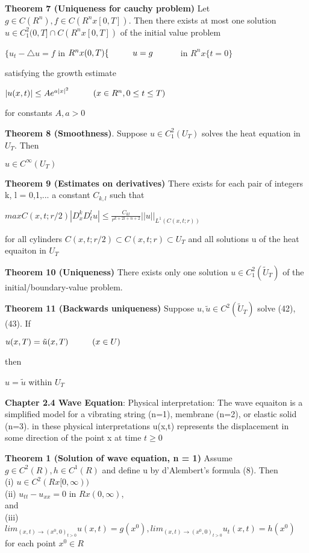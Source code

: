 \documentclass{article}
\newcommand\tab[1][1cm]{\hspace*{#1}}
\begin{document}
\textbf {Theorem 7 (Uniqueness for cauchy problem)} Let $g \in C(R^n), f \in C(R^n x [0,T])$. Then there exists at most one solution $u \in C_1^2(0, T] \cap C(R^n x [0,T])$ of the initial value problem
\begin{center}
$\{ u_t - \triangle u = f$ \tab in $R^n x (0,T) 
 \{ \tab u = g \tab$ in $R^n x \{t = 0\}$
\end{center}
satisfying the growth estimate
\begin{center}
$|u(x,t)| \leq Ae^{a|x|^2} \tab (x \in R^n, 0 \leq t \leq T)$
\end{center}
for constants $A, a > 0$

\textbf {Theorem 8 (Smoothness)}. Suppose $u \in C_1^2(U_T)$ solves the heat equation in $U_T$. Then
\begin{center}
$u \in C^{\infty}(U_T)$
\end{center}

\textbf {Theorem 9 (Estimates on derivatives)} There exists for each pair of integers k, l = 0,1,... a constant $C_{k,l}$ such that 
\begin{center}
$max{C(x,t; r/2)} |D_x^k D_t^l u| \leq \frac{C_{kl}}{r^{k+2l+n+2}}||u||_{L^1(C(x,t;r))}$
\end{center}
for all cylinders $C(x, t;r/2) \subset C(x,t;r) \subset U_T$ and all solutions u of the heat equaiton in $U_T$

\textbf {Theorem 10 (Uniqueness)} There exists only one solution $u \in C_1^2(\tilde{U}_T)$ of the initial/boundary-value problem.

\textbf {Theorem 11 (Backwards uniqueness)} Suppose $u, \tilde{u} \in C^2(\tilde{U}_T)$ solve (42), (43). If 
\begin{center}
$u(x,T) = \tilde{u}(x,T) \tab (x \in U)$
\end{center}
then
\begin{center}
$u = \tilde{u}$ within $U_T$
\end{center}

\textbf {Chapter 2.4 Wave Equation}: Physical interpretation: The wave equaiton is a simplified model for a vibrating string (n=1), membrane (n=2), or elastic solid (n=3). in these physical interpretations u(x,t) represents the displacement in some direction of the point x at time $t \geq 0$

\textbf {Theorem 1 (Solution of wave equation, n = 1)} Assume $g \in C^2(R), h \in C^1(R)$ and define u by d'Alembert's formula (8). Then \\
\tab (i) $u \in C^2(R x [0, \infty))$ \\
\tab (ii) $u_{tt}-u_{xx} = 0$ in $R x (0, \infty)$, \\
and \\
\tab (iii) $lim_{{(x,t) \to (x^0, 0)}_{t>0}} u(x,t) = g(x^0), lim_{{(x,t) \to (x^0, 0)}_{t>0}} u_t(x,t) = h(x^0)$ \\
for each point $x^0 \in R$
\end{document}
